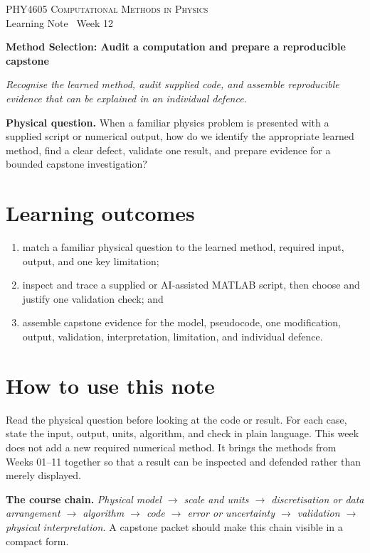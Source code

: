 \documentclass[11pt,a4paper]{article}
\newcommand{\course}{PHY4605 Computational Methods in Physics}
\begin{document}
{\large\textsc{\course}}\\[-2pt]
{\small Learning Note \textbar\ Week 12}\par\vspace{4pt}
{\LARGE\bfseries Method Selection: Audit a computation and prepare a \mbox{reproducible} capstone}\par\vspace{3pt}
\textit{Recognise the learned method, audit supplied code, and assemble reproducible evidence that can be \mbox{explained} in an individual defence.}

\begin{keybox}\textbf{Physical question.} When a familiar physics problem is presented with a supplied script or numerical output, how do we identify the appropriate learned method, find a clear defect, validate one result, and prepare evidence for a bounded capstone investigation?\end{keybox}

\section*{Learning outcomes}
\begin{enumerate}[nosep,leftmargin=5mm]
\item match a familiar physical question to the learned method, required input, output, and one key limitation;
\item inspect and trace a supplied or AI-assisted MATLAB script, then choose and justify one validation check; and
\item assemble capstone evidence for the model, pseudocode, one modification, output, validation, interpretation, limitation, and individual defence.
\end{enumerate}

\section*{How to use this note}
Read the physical question before looking at the code or result. For each case, state the input, output, units, algorithm, and check in plain language. This week does not add a new required numerical method. It brings the methods from Weeks 01--11 together so that a result can be inspected and defended rather than merely displayed.

\begin{keybox}\textbf{The course chain.} \emph{Physical model $\rightarrow$ scale and units $\rightarrow$ discretisation or data arrangement $\rightarrow$ algorithm $\rightarrow$ code $\rightarrow$ error or uncertainty $\rightarrow$ validation $\rightarrow$ physical interpretation.} A capstone packet should make this chain visible in a compact form.\end{keybox}
\end{document}
